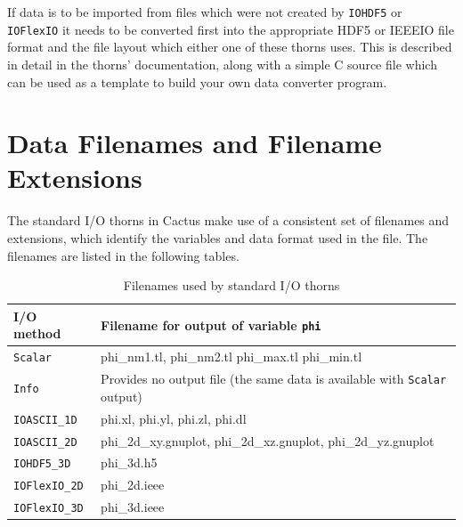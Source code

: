 \documentclass{article}
\begin{document}
If data is to be imported from files which were not created by
{\tt IOHDF5} or {\tt IOFlexIO} it needs to be converted first into the
appropriate HDF5 or IEEEIO file format and the file layout
which either one of these thorns uses. This is described in detail in the
thorns' documentation, along with a simple C source file which can be used as a
template to build your own data converter program.


\section{Data Filenames and Filename Extensions}

The standard I/O thorns in Cactus make use of a consistent set of filenames
and extensions, which identify the variables and data format used in the file.
The filenames are listed in the following tables.

\begin{center}
\begin{table}[htb]
\label{filename_table}
\begin{tabular}{|l|l|}
  \hline
  {\bf I/O method}   & {\bf Filename for output of variable {\tt phi}}\\
  \hline
  {\tt Scalar}       & phi\_nm1.tl, phi\_nm2.tl phi\_max.tl phi\_min.tl\\
  {\tt Info}         & Provides no output file (the same data is available with {\tt Scalar} output)\\
  {\tt IOASCII\_1D}  & phi.xl, phi.yl, phi.zl, phi.dl\\
  {\tt IOASCII\_2D}  & phi\_2d\_xy.gnuplot, phi\_2d\_xz.gnuplot, phi\_2d\_yz.gnuplot\\
  {\tt IOHDF5\_3D}   & phi\_3d.h5\\
  {\tt IOFlexIO\_2D} & phi\_2d.ieee\\
  {\tt IOFlexIO\_3D} & phi\_3d.ieee\\
  \hline
\end{tabular}
\caption{Filenames used by standard I/O thorns}
\end{table}
\end{center}
\end{document}
